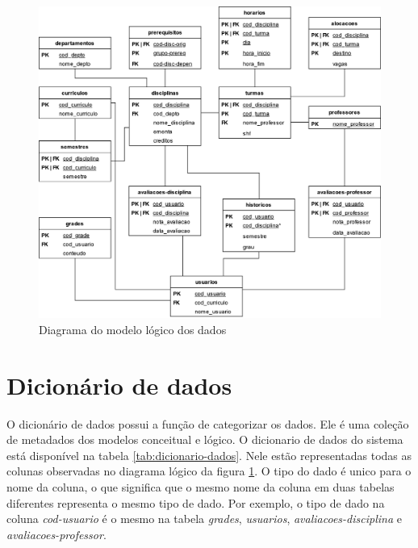 \begin{figure}[ht]
    \begin{center}
    \includegraphics[width=390pt]{figuras/diagrama-logico.png}
    \caption{Diagrama do modelo lógico dos dados}
    \label{fig:modelo-logico}
    \end{center}
\end{figure}

\section{Dicionário de dados}

O dicionário de dados possui a função de categorizar os dados. 
Ele é uma coleção de metadados dos modelos conceitual e lógico. 
O dicionario de dados do sistema está disponível na tabela \ref{tab:dicionario-dados}. 
Nele estão representadas todas as colunas observadas no diagrama lógico da figura \ref{fig:modelo-logico}.
O tipo do dado é unico para o nome da coluna, o que significa que o mesmo nome da coluna em duas tabelas diferentes representa o mesmo tipo de dado. 
Por exemplo, o tipo de dado na coluna \textit{cod-usuario} é o mesmo na tabela \textit{grades}, \textit{usuarios}, \textit{avaliacoes-disciplina} e \textit{avaliacoes-professor}.


